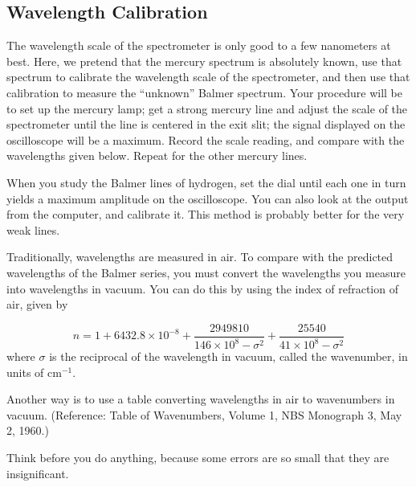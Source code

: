 \documentclass{../lab}
\begin{document}
\subsection{Wavelength Calibration}

The wavelength scale of the spectrometer is only good to a few nanometers at best. Here, we pretend that the mercury spectrum is absolutely known, use that spectrum to calibrate the wavelength scale of the spectrometer, and then use that calibration to measure the ``unknown'' Balmer spectrum. Your procedure will be to set up the mercury lamp; get a strong mercury line and adjust the scale of the spectrometer until the line is centered in the exit slit; the signal displayed on the oscilloscope will be a maximum. Record the scale reading, and compare with the wavelengths given below. Repeat for the other mercury lines.

When you study the Balmer lines of hydrogen, set the dial until each one in turn yields a maximum amplitude on the oscilloscope. You can also look at the output from the computer, and calibrate it. This method is probably better for the very weak lines.

Traditionally, wavelengths are measured in air. To compare with the predicted wavelengths of the Balmer series, you must convert the wavelengths you measure into wavelengths in vacuum. You can do this by using the index of refraction of air, given by

\begin{equation}
    n=1+6432.8 \times 10^{-8}+\frac{2949810}{146\times10^8-\sigma^{2}}+\frac{25540}{41\times10^8-\sigma^{2}}
\end{equation}
where $\sigma$ is the reciprocal of the wavelength in vacuum, called the wavenumber, in units of cm$^{-1}$.

Another way is to use a table converting wavelengths in air to wavenumbers in vacuum. (Reference: Table of Wavenumbers, Volume 1, NBS Monograph 3, May 2, 1960.)

Think before you do anything, because some errors are so small that they are insignificant.
\end{document}
